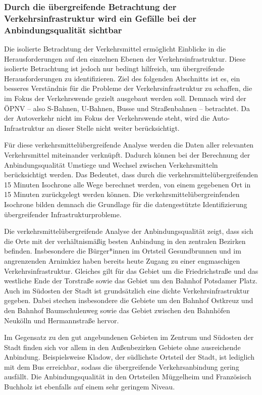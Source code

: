 \subsubsection{Durch die übergreifende Betrachtung der Verkehrsinfrastruktur wird ein Gefälle bei der Anbindungsqualität sichtbar}
Die isolierte Betrachtung der Verkehrsmittel ermöglicht Einblicke in die Herausforderungen auf den einzelnen Ebenen der Verkehrsinfrastruktur. Diese isolierte Betrachtung ist jedoch nur bedingt hilfreich, um übergreifende Herausforderungen zu identifizieren. Ziel des folgenden Abschnitts ist es, ein besseres Verständnis für die Probleme der Verkehrsinfrastruktur zu schaffen, die im Fokus der Verkehrswende gezielt ausgebaut werden soll. Demnach wird der ÖPNV – also S-Bahnen, U-Bahnen, Busse und Straßenbahnen – betrachtet. Da der Autoverkehr nicht im Fokus der Verkehrswende steht, wird die Auto-Infrastruktur an dieser Stelle nicht weiter berücksichtigt.

Für diese verkehrsmittelübergreifende Analyse werden die Daten aller relevanten Verkehrsmittel miteinander verknüpft. Dadurch können bei der Berechnung der Anbindungsqualität Umstiege und Wechsel zwischen Verkehrsmitteln berücksichtigt werden. Das Bedeutet, dass durch die verkehrsmittelübergreifenden 15 Minuten Isochrone alle Wege berechnet werden, von einem gegebenen Ort in 15 Minuten zurückgelegt werden können. Die verkehrsmittelübergreinfenden Isochrone bilden demnach die Grundlage für die datengestützte Identifizierung übergreifender Infrastrukturprobleme.


Die verkehrsmittelübergreifende Analyse der Anbindungsqualität zeigt, dass sich die Orte mit der verhältnismäßig besten Anbindung in den zentralen Bezirken befinden. Insbesondere die Bürger*innen im Ortsteil Gesundbrunnen und im angrenzenden Arnimkiez haben bereits heute Zugang zu einer engmaschigen Verkehrsinfrastruktur. Gleiches gilt für das Gebiet um die Friedrichstraße und das westliche Ende der Torstraße sowie das Gebiet um den Bahnhof Potsdamer Platz. Auch im Südosten der Stadt ist grundsätzlich eine dichte Verkehrsinfrastruktur gegeben. Dabei stechen insbesondere die Gebiete um den Bahnhof Ostkreuz und den Bahnhof Baumschulenweg sowie das Gebiet zwischen den Bahnhöfen Neukölln und Hermannstraße hervor.

Im Gegensatz zu den gut angebundenen Gebieten im Zentrum und Südosten der Stadt finden sich vor allem in den Außenbezirken Gebiete ohne ausreichende Anbindung. Beispielsweise Kladow, der südlichste Ortsteil der Stadt, ist lediglich mit dem Bus erreichbar, sodass die übergreifende Verkehrsanbindung gering ausfällt. Die Anbindungsqualität in den Ortsteilen Müggelheim und Französisch Buchholz ist ebenfalls auf einem sehr geringem Niveau.

